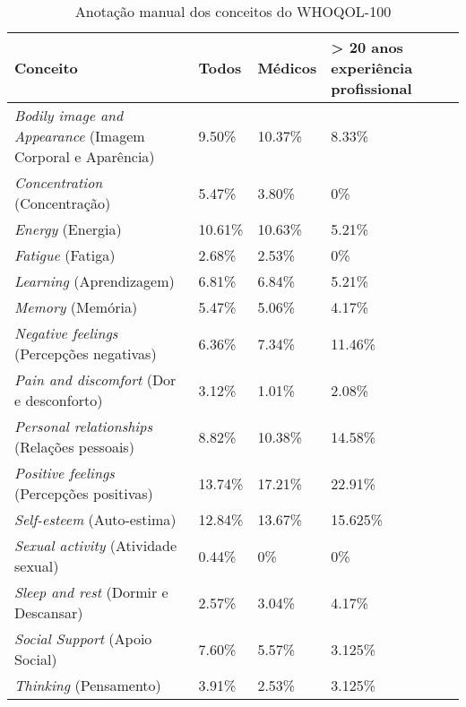 \begin{table}[H]
\centering
\renewcommand{\arraystretch}{1.3}
\begin{tabular}{|m{5.5cm}|m{2.0cm}|m{2.0cm}|m{2.5cm}|}
\hline
\textbf{Conceito}&\textbf{Todos}&\textbf{Médicos}&\textbf{> 20 anos experiência profissional}\\ \hline

\textit{Bodily image and Appearance} (Imagem Corporal e Aparência) & 9.50\% & 10.37\% & 8.33\% \\ \hline
\textit{Concentration} (Concentração) & 5.47\% & 3.80\% & 0\%\\ \hline
\textit{Energy} (Energia) & 10.61\% & 10.63\% & 5.21\%\\ \hline
\textit{Fatigue} (Fatiga) & 2.68\% & 2.53\% & 0\%\\ \hline
\textit{Learning} (Aprendizagem) & 6.81\% & 6.84\% & 5.21\% \\ \hline
\textit{Memory} (Memória) & 5.47\% & 5.06\% & 4.17\% \\ \hline
\textit{Negative feelings} (Percepções negativas) & 6.36\% & 7.34\% & 11.46\% \\ \hline
\textit{Pain and discomfort} (Dor e desconforto) & 3.12\% & 1.01\% & 2.08\%  \\ \hline
\textit{Personal relationships} (Relações pessoais)& 8.82\% & 10.38\% & 14.58\% \\ \hline
\textit{Positive feelings} (Percepções positivas)& 13.74\% & 17.21\% & 22.91\% \\ \hline
\textit{Self-esteem} (Auto-estima) & 12.84\% & 13.67\%& 15.625\% \\ \hline
\textit{Sexual activity} (Atividade sexual)& 0.44\% & 0\% & 0\%\\ \hline
\textit{Sleep and rest} (Dormir e Descansar)& 2.57\% & 3.04\%& 4.17\% \\ \hline
\textit{Social Support} (Apoio Social) & 7.60\% & 5.57\%& 3.125\% \\ \hline
\textit{Thinking} (Pensamento) & 3.91\% & 2.53\% & 3.125\% \\ \hline

\end{tabular}
\caption{\label{tab:anotacoes-conceitos-wholqol100}Anotação manual dos conceitos do WHOQOL-100}
\end{table}
